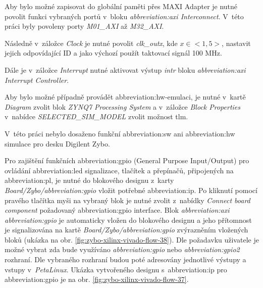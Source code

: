 \documentclass[a4paper, twoside, 11pt]{article}
\begin{document}
\begin{appendices}
		Aby bylo možné zapisovat do globální paměti přes MAXI Adapter je nutné povolit funkci vybraných portů v~bloku \textit{\gls{abbreviation:axi} Interconnect}. V~této práci byly povoleny porty \textit{M01\_AXI} až \textit{M32\_AXI}.\par
		Následně v~záložce \textit{Clock} je nutné povolit \textit{clk\_outx}, kde $x \in <1,5>$, nastavit jejich odpovídající ID a jako výchozí použít taktovací signál 100 MHz.\par
		Dále je v~záložce \textit{Interrupt} nutné aktivovat výstup \textit{intr} bloku \textit{\gls{abbreviation:axi} Interrupt Controller}.\par
		Aby bylo možné případně provádět \gls{abbreviation:hw}-emulaci, je nutné v~kartě \textit{Diagram} zvolit blok \textit{ZYNQ7 Processing System} a v~záložce \textit{Block Properties} v~nabídce \textit{SELECTED\_SIM\_MODEL} zvolit možnost tlm. \cite{hackster-vitis-2021-1-embedded-platform-for-zybo-z7-20}\par
		V~této práci nebylo dosaženo funkční \gls{abbreviation:sw} ani \gls{abbreviation:hw} simulace pro desku Digilent Zybo.\par
		Pro zajištění funkčních \gls{abbreviation:gpio} (General Purpose Input/Output) pro ovládání \gls{abbreviation:led} signalizace, tlačítek a přepínačů, připojených na \gls{abbreviation:pl}, je nutné do blokového designu z~karty \textit{Board/Zybo/\gls{abbreviation:gpio}} vložit potřebné \gls{abbreviation:ip}. Po kliknutí pomocí pravého tlačítka myši na vybraný blok je nutné zvolit z~nabídky \textit{Connect board component} požadovaný \gls{abbreviation:gpio} interface. Blok \textit{\gls{abbreviation:axi} \gls{abbreviation:gpio}} je automaticky vložen do blokového designu a jeho přítomnost je signalizována na kartě \textit{Board/Zybo/\gls{abbreviation:gpio}} zvýrazněním vložených bloků (ukázka na obr. \ref{fig:zybo-xilinx-vivado-flow-38}). Dle požadavku uživatele je možné vybrat zda bude využíváno \textit{\gls{abbreviation:gpio}} nebo \textit{\gls{abbreviation:gpio}2} rozhraní. Dle vybraného rozhraní budou poté adresovány jednotlivé výstupy a vstupy v~\textit{PetaLinux}. Ukázka vytvořeného designu s~\gls{abbreviation:ip} pro \gls{abbreviation:gpio} je na obr. \ref{fig:zybo-xilinx-vivado-flow-37}.



\end{appendices}
\end{document}
